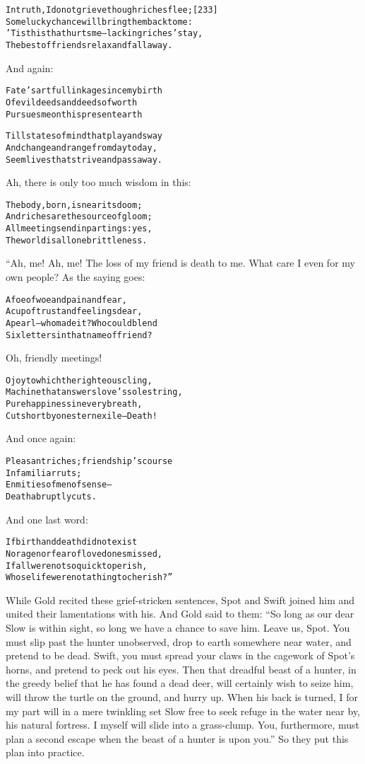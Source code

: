\documentclass{article}
\renewenvironment{verbatim}{\begin{alltt}\normalfont\begin{centering}}{\end{centering}\end{alltt}}
\begin{document}
\begin{verbatim}
In truth, I do not grieve though riches flee;           [233]
Some lucky chance will bring them back to me:
'Tis this that hurts me--lacking riches' stay,
The best of friends relax and fall away.
\end{verbatim}
And again:

\begin{verbatim}
Fate's artful linkage since my birth
Of evil deeds and deeds of worth
Pursues me on this present earth

Till states of mind that play and sway
And change and range from day to day,
Seem lives that strive and pass away.
\end{verbatim}
Ah, there is only too much wisdom in this:

\begin{verbatim}
The body, born, is near its doom;
And riches are the source of gloom;
All meetings end in partings: yes,
The world is all one brittleness.
\end{verbatim}
“Ah, me! Ah, me! The loss of my friend is death to me. What care I
even for my own people? As the saying goes:

\begin{verbatim}
A foe of woe and pain and fear,
A cup of trust and feelings dear,
A pearl--who made it? Who could blend
Six letters in that name of friend?
\end{verbatim}
Oh, friendly meetings!

\begin{verbatim}
O joy to which the righteous cling,
Machine that answers love's sole string,
Pure happiness in every breath,
Cut short by one stern exile--Death!
\end{verbatim}
And once again:

\begin{verbatim}
Pleasant riches; friendship's course
    In familiar ruts;
Enmities of men of sense--
    Death abruptly cuts.
\end{verbatim}
And one last word:

\begin{verbatim}
If birth and death did not exist
Nor age nor fear of loved ones missed,
If all were not so quick to perish,
Whose life were not a thing to cherish?”
\end{verbatim}
While Gold recited these grief-stricken sentences, Spot and Swift
joined him and united their lamentations with his. And Gold said to
them:
``So long as our dear Slow is within sight, so long we have a chance to save him. Leave us, Spot. You must slip past the hunter unobserved, drop to earth somewhere near water, and pretend to be dead. Swift, you must spread your claws in the cagework of Spot's horns, and pretend to peck out his eyes. Then that dreadful beast of a hunter, in the greedy belief that he has found a dead deer, will certainly wish to seize him, will throw the turtle on the ground, and hurry up. When his back is turned, I for my part will in a mere twinkling set Slow free to seek refuge in the water near by, his natural fortress. I myself will slide into a grass-clump. You, furthermore, must plan a second escape when the beast of a hunter is upon you.''
So they put this plan into practice.
\end{document}

